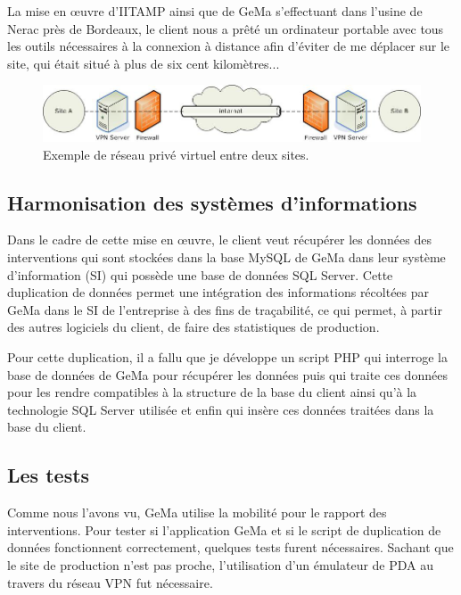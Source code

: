 La mise en \oe{}uvre d'IITAMP ainsi que de GeMa s'effectuant dans
l'usine de Nerac près de Bordeaux, le client nous a prêté un ordinateur
portable avec tous les outils nécessaires à la connexion à distance afin
d'éviter de me déplacer sur le site, qui était situé à plus de six cent
kilomètres...

\begin{figure}
  \begin{center}
    \includegraphics[scale=0.5]{images/vpn.png}
    \caption{Exemple de réseau privé virtuel entre deux sites.}
    \label{vpn}
  \end{center}
\end{figure}

\subsection{Harmonisation des systèmes d'informations} %
\label{sub:Harmonisation des systèmes d'informations}

Dans le cadre de cette mise en \oe{}uvre, le client veut récupérer les
données des interventions qui sont stockées dans la base MySQL de GeMa
dans leur système d'information (SI) qui possède une base de données SQL
Server. Cette duplication de données permet une intégration des
informations récoltées par GeMa dans le SI de l'entreprise à des fins de
traçabilité, ce qui permet, à partir des autres logiciels du client, de
faire des statistiques de production.

Pour cette duplication, il a fallu que je développe un script PHP qui
interroge la base de données de GeMa pour récupérer les données puis qui
traite ces données pour les rendre compatibles à la structure de la base
du client ainsi qu'à la technologie SQL Server utilisée et enfin qui
insère ces données traitées dans la base du client.

\subsection{Les tests} %
\label{sub:Les tests}

Comme nous l'avons vu, GeMa utilise la mobilité pour le rapport des
interventions. Pour tester si l'application GeMa et si le script de
duplication de données fonctionnent correctement, quelques tests furent
nécessaires. Sachant que le site de production n'est pas proche,
l'utilisation d'un émulateur de PDA au travers du réseau VPN fut
nécessaire.

